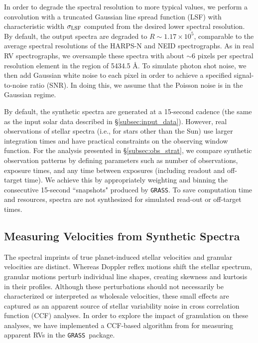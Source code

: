 \documentclass[twocolumn]{aastex63}
\newcommand{\grass}{\texttt{GRASS}}
\newcommand{\revise}[1]{#1}
\begin{document}
In order to degrade the spectral resolution to more typical values, we perform a convolution with a truncated Gaussian line spread function (LSF) with characteristic width $\sigma_{\rm LSF}$ computed from the desired lower spectral resolution. By default, the output spectra are degraded to $R \sim 1.17 \times 10^5$\revise{, comparable to the average spectral resolutions of the HARPS-N and NEID spectrographs}. As in real RV spectrographs, we oversample these spectra with about $\sim$6 pixels per spectral resolution element in the region of 5434.5 \AA. To simulate photon shot noise, we then add Gaussian white noise to each pixel in order to achieve a specified signal-to-noise ratio (SNR). In doing this, we assume that the Poisson noise is in the Gaussian regime. \par

By default, the synthetic spectra are generated at a 15-second cadence (the same as the input solar data described in \S\ref{subsec:input_data}). However, real observations of stellar spectra (i.e., for stars other than the Sun) use larger integration times and have practical constraints on the observing window function. For the analysis presented in \S\ref{subsec:obs_strat}, we compare synthetic observation patterns by defining parameters such as number of observations, exposure times, and any time between exposures (including readout and off-target time). We achieve this by appropriately weighting and binning the consecutive 15-second ``snapshots" produced by \grass. \revise{To save computation time and resources, spectra are not synthesized for simulated read-out or off-target times.} \par 

% 

\subsection{Measuring Velocities from Synthetic Spectra} \label{subsec:veloc}
The spectral imprints of true planet-induced stellar velocities and granular velocities are distinct. Whereas Doppler reflex motions shift the stellar spectrum, granular motions perturb individual line shapes, creating skewness and kurtosis in their profiles. Although these perturbations should not necessarily be characterized or interpreted as wholesale velocities, these small effects are captured as an apparent source of stellar variability noise in cross correlation function (CCF) analyses. In order to explore the impact of granulation on these analyses, we have implemented a CCF-based algorithm \revise{from \citet{EchelleCCFs}} for measuring apparent RVs in the \grass\ package. \par  
\end{document}
